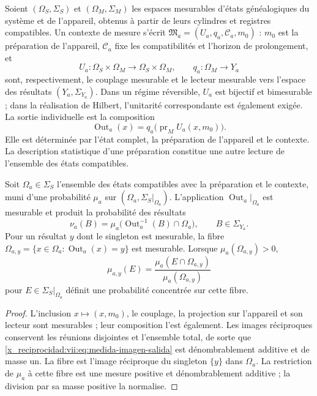Soient \((\Omega_S,\Sigma_S)\) et \((\Omega_M,\Sigma_M)\) les espaces
mesurables d’états généalogiques du système et de l’appareil, obtenus à partir de
leurs cylindres et registres compatibles. Un contexte de mesure s’écrit
\(\mathfrak M_a=(U_a,q_a,\mathcal C_a,m_0)\) : \(m_0\) est la
préparation de l’appareil, \(\mathcal C_a\) fixe les compatibilités et
l’horizon de prolongement, et
\[
 U_a:\Omega_S\times\Omega_M\longrightarrow\Omega_S\times\Omega_M,
 \qquad q_a:\Omega_M\longrightarrow Y_a
\]
sont, respectivement, le couplage mesurable et le lecteur mesurable vers l'espace des résultats \((Y_a,\Sigma_{Y_a})\). Dans un régime réversible, \(U_a\) est bijectif et bimesurable ; dans la réalisation de Hilbert, l'unitarité correspondante est également exigée. La sortie individuelle est la composition
\begin{equation}
 \operatorname{Out}_a(x)
 =q_a\bigl(\operatorname{pr}_M U_a(x,m_0)\bigr).
 \label{x_reciprocidad:vii:eq:out-genealogico}
\end{equation}
Elle est déterminée par l’état complet, la préparation de l’appareil et
le contexte. La description statistique d’une préparation constitue
une autre lecture de l’ensemble des états compatibles.

\begin{proposition}
\label{x_reciprocidad:vii:prop:medida-salida}
Soit \(\Omega_a\in\Sigma_S\) l’ensemble des états compatibles avec la
préparation et le contexte, muni d’une probabilité \(\mu_a\) sur
\((\Omega_a,\Sigma_S|_{\Omega_a})\).
L’application \(\operatorname{Out}_a|_{\Omega_a}\) est mesurable et produit
la probabilité des résultats
\begin{equation}
 \nu_a(B)=\mu_a\bigl(\operatorname{Out}_a^{-1}(B)\cap\Omega_a\bigr),
 \qquad B\in\Sigma_{Y_a}.
 \label{x_reciprocidad:vii:eq:medida-imagen-salida}
\end{equation}
Pour un résultat \(y\) dont le singleton est mesurable, la fibre \(\Omega_{a,y}=\{x\in\Omega_a:\operatorname{Out}_a(x)=y\}\) est mesurable. Lorsque \(\mu_a(\Omega_{a,y})>0\),
\begin{equation}
 \mu_{a,y}(E)=
 \frac{\mu_a(E\cap\Omega_{a,y})}{\mu_a(\Omega_{a,y})}
 \label{x_reciprocidad:vii:eq:condicionamiento-salida}
\end{equation}
pour \(E\in\Sigma_S|_{\Omega_a}\) définit une probabilité concentrée
sur cette fibre.
\end{proposition}
\begin{proof}
L'inclusion \(x\mapsto(x,m_0)\), le couplage, la projection sur l'appareil et son lecteur sont mesurables ; leur composition l'est également. Les images réciproques conservent les réunions disjointes et l'ensemble total, de sorte que \eqref{x_reciprocidad:vii:eq:medida-imagen-salida} est dénombrablement additive et de masse un. La fibre est l'image réciproque du singleton \(\{y\}\) dans \(\Omega_a\). La restriction de \(\mu_a\) à cette fibre est une mesure positive et dénombrablement additive ; la division par sa masse positive la normalise.
\end{proof}

